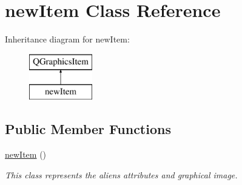 \hypertarget{classnew_item}{\section{new\-Item Class Reference}
\label{classnew_item}
}
Inheritance diagram for new\-Item\-:\begin{figure}[H]
\begin{center}
\leavevmode
\includegraphics[height=2.000000cm]{classnew_item}
\end{center}
\end{figure}
\subsection*{Public Member Functions}
\begin{DoxyCompactItemize}
\item 
\hypertarget{classnew_item_a108d48d219414392c5052e1b06145565}{\hyperlink{classnew_item_a108d48d219414392c5052e1b06145565}{new\-Item} ()}\label{classnew_item_a108d48d219414392c5052e1b06145565}

\begin{DoxyCompactList}\small\item\em This class represents the aliens attributes and graphical image. \end{DoxyCompactList}\end{DoxyCompactItemize}
